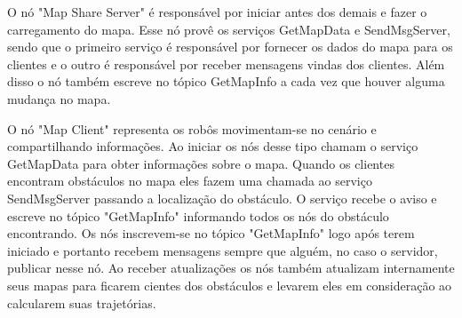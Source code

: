 \documentclass[eq,capa]{texufpel}
\begin{document}


O nó "Map Share Server" é responsável por iniciar antes dos demais e fazer o carregamento do mapa. Esse nó provê os serviços GetMapData e SendMsgServer, sendo que o primeiro serviço é responsável por fornecer os dados do mapa para os clientes e o outro é responsável por receber mensagens vindas dos clientes. Além disso o nó também escreve no tópico GetMapInfo a cada vez que houver alguma mudança no mapa.

O nó "Map Client" representa os robôs movimentam-se no cenário e compartilhando informações. Ao iniciar os nós desse tipo chamam o serviço GetMapData para obter informações sobre o mapa. Quando os clientes encontram obstáculos no mapa eles fazem uma chamada ao serviço SendMsgServer passando a localização do obstáculo. O serviço recebe o aviso e escreve no tópico "GetMapInfo" informando todos os nós do obstáculo encontrando. Os nós inscrevem-se no tópico "GetMapInfo" logo após terem iniciado e portanto recebem mensagens sempre que alguém, no caso o servidor, publicar nesse nó. Ao receber atualizações os nós também atualizam internamente seus mapas para ficarem cientes dos obstáculos e levarem eles em consideração ao calcularem suas trajetórias.


\end{document}
